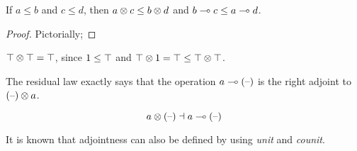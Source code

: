\begin{proposition} 
\label{RL:stability}
If $a \leq b$ and $c \leq d$, 
then 
$ a \otimes c \leq b \otimes d$
and
$ b \multimap c \leq a \multimap d$.
\end{proposition}

\begin{proof}
Pictorially; 
\end{proof}

\begin{fact}
$ \top \otimes \top = \top$, 
since $ \mbox{\boldmath{1}} \leq \top$ and 
$\top \otimes \mbox{\boldmath{1}} = \top \leq \top \otimes \top$. 
\end{fact}

The residual law exactly says that
the operation $a \multimap {(\mbox{\textendash})}$ is the right adjoint to 
${(\mbox{\textendash})} \otimes a$.

\[  a  \otimes  {(\mbox{\textendash})}  \dashv   a \multimap {(\mbox{\textendash})}  \]

It is known that adjointness can also be defined 
by using {\em unit} and {\em counit}.
%
%
\newcommand{\RLunit}{c \fCenter a \RLimp (a \RLotimes c)}
\newcommand{\RLcounit}{a \RLotimes (a \RLimp b) \fCenter b}

